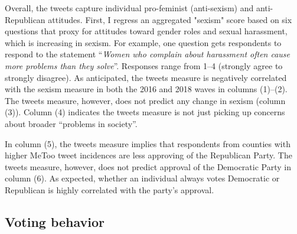\documentclass[manuscript,screen,nonacm,11pt,acm]{acmart}
\begin{document}
\begin{bibunit}
Overall, the tweets capture individual pro-feminist (anti-sexism) and anti-Republican attitudes.
First, I regress an aggregated "sexism" score based on six questions that proxy for attitudes toward gender roles and sexual harassment, which is increasing in sexism.
For example, one question gets respondents to respond to the statement ``\emph{Women who complain about harassment often cause more problems than they solve}''.
Responses range from 1--4 (strongly agree to strongly disagree).
As anticipated, the tweets measure is negatively correlated with the sexism measure in both the 2016 and 2018 waves in columns (1)--(2).
The tweets measure, however, does not predict any change in sexism (column (3)).
Column (4) indicates the tweets measure is not just picking up concerns about broader ``problems in society''.

In column (5), the tweets measure implies that respondents from counties with higher MeToo tweet incidences are less approving of the Republican Party.
The tweets measure, however, does not predict approval of the Democratic Party in column (6).
As expected, whether an individual always votes Democratic or Republican is highly correlated with the party's approval.

\subsection{Voting behavior}


\end{bibunit}
\end{document}

